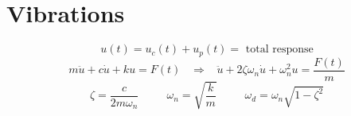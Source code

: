 \documentclass[twocolumn, 12pt]{article}    %
\begin{document}
\RaggedRight
\footnotesize %
\section*{Vibrations}



\begin{equation*}
    u(t) = u_c(t) +u_p(t) = \text{ total response}
\end{equation*}
\begin{equation*}
    m\ddot{u} + c\dot{u} + ku = F(t) \hspace{10pt}
    \Longrightarrow \hspace{10pt}
    \ddot{u} + 2\zeta\omega_n\dot{u} + \omega_n^2u = \frac{F(t)}{m}
\end{equation*}
\begin{equation*}
    \zeta = \frac{c}{2m\omega_n} \hspace{30pt}
    \omega_n = \sqrt{\frac{k}{m}} \hspace{30pt}
    \omega_d = \omega_n\sqrt{1-\zeta^2}
\end{equation*}


\noindent
\end{document}
